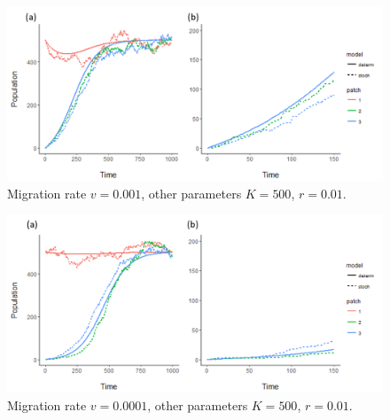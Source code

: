 \documentclass[12pt, openany]{book}
\theoremstyle{definition}
\theoremstyle{remark}
\numberwithin{equation}{chapter}
\numberwithin{figure}{chapter}
\begin{document}
\begin{figure}[t!]
\begin{center}
       \includegraphics[width=1.0\textwidth]{combinedv001.png}
       \caption{Migration rate $v = 0.001$, other parameters $K = 500$, $r = 0.01$.\label{combinedv001}}
\end{center}
\end{figure}  

\begin{figure}[t!]
\begin{center}
       \includegraphics[width=1.0\textwidth]{combinedv0001.png}
       \caption{Migration rate $v = 0.0001$, other parameters $K = 500$, $r = 0.01$.\label{combinedv0001}}
\end{center}
\end{figure}  
\end{document}
